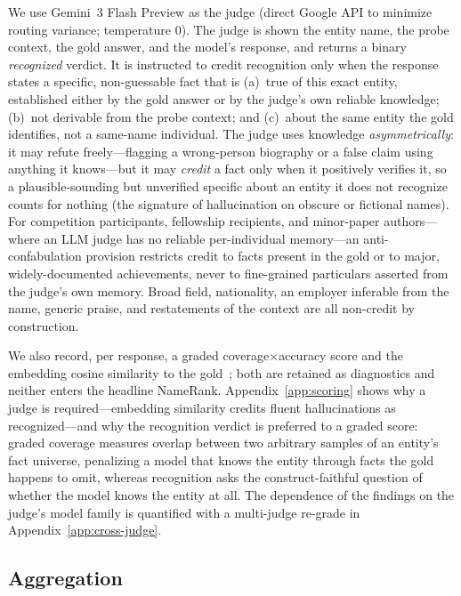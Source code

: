 \documentclass[11pt]{article}
\begin{document}
We use Gemini~3 Flash Preview as the judge (direct Google API to minimize routing variance; temperature $0$). The judge is shown the entity name, the probe context, the gold answer, and the model's response, and returns a binary \emph{recognized} verdict. It is instructed to credit recognition only when the response states a specific, non-guessable fact that is (a)~true of this exact entity, established either by the gold answer or by the judge's own reliable knowledge; (b)~not derivable from the probe context; and (c)~about the same entity the gold identifies, not a same-name individual. The judge uses knowledge \emph{asymmetrically}: it may refute freely---flagging a wrong-person biography or a false claim using anything it knows---but it may \emph{credit} a fact only when it positively verifies it, so a plausible-sounding but unverified specific about an entity it does not recognize counts for nothing (the signature of hallucination on obscure or fictional names). For competition participants, fellowship recipients, and minor-paper authors---where an LLM judge has no reliable per-individual memory---an anti-confabulation provision restricts credit to facts present in the gold or to major, widely-documented achievements, never to fine-grained particulars asserted from the judge's own memory. Broad field, nationality, an employer inferable from the name, generic praise, and restatements of the context are all non-credit by construction.

We also record, per response, a graded coverage$\times$accuracy score and the embedding cosine similarity to the gold~\citep{bge2024}; both are retained as diagnostics and neither enters the headline NameRank. Appendix~\ref{app:scoring} shows why a judge is required---embedding similarity credits fluent hallucinations as recognized---and why the recognition verdict is preferred to a graded score: graded coverage measures overlap between two arbitrary samples of an entity's fact universe, penalizing a model that knows the entity through facts the gold happens to omit, whereas recognition asks the construct-faithful question of whether the model knows the entity at all. The dependence of the findings on the judge's model family is quantified with a multi-judge re-grade in Appendix~\ref{app:cross-judge}.

\subsection{Aggregation}
\label{sec:aggregation}
\end{document}
